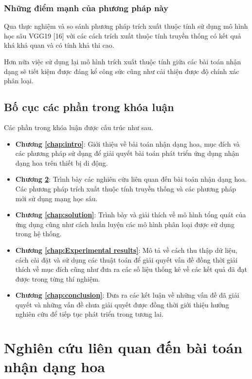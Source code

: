 \documentclass[12pt]{report}
\begin{document}
										
		\subsection{Những điểm mạnh của phương pháp này}
		Qua thực nghiệm và so sánh phương pháp trích xuất thuộc tính sử dụng mô hình học sâu VGG19 [16] với các cách trích xuất thuộc tính truyền thống có kết quả khá khả quan và có tính khả thi cao.
						
		Hơn nữa việc sử dụng lại mô hình trích xuất thuộc tính giữa các bài toán nhận dạng sẽ tiết kiệm được đáng kể công sức cũng như cải thiện được độ chính xác phân loại.
						
		\section{Bố cục các phần trong khóa luận}
		Các phần trong khóa luận được cấu trúc như sau.
						
				
		\begin{itemize}
			\item \textbf{Chương \ref{chap:intro}}: Giới thiệu về bài toán nhận dạng hoa, mục đích và các phương pháp sử dụng để giải quyết bài toán phát triển ứng dụng nhận dạng hoa trên thiết bị di động.
			\item \textbf{Chương \ref{chap:background}}: Trình bày các nghiên cứu liên quan đến bài toán nhận dạng hoa. Các phương pháp trích xuất thuộc tính truyền thống và các phương pháp mới sử dụng mạng học sâu.
			\item \textbf{Chương \ref{chap:solution}}: Trình bày và giải thích về mô hình tổng quát của ứng dụng cũng như cách huấn luyện các mô hình phân loại được sử dụng trong hệ thống.
			\item \textbf{Chương \ref{chap:Experimental results}}: Mô tả về cách thu thập dữ liệu, cách cài đặt và sử dụng các thuật toán để giải quyết vấn đề đồng thời giải thích về mục đích cũng như đưa ra các số liệu thống kê về các kết quả đã đạt được trong từng thí nghiệm. 
			\item \textbf{Chương \ref{chap:conclusion}}: Đưa ra các kết luận về những vấn đề đã giải quyết và những vấn đề chưa giải quyết được đồng thời giới thiệu hướng nghiên cứu để tiếp tục phát triển trong tương lai.	      
		\end{itemize}
						
		
				
				
		\newpage	
		\chapter{Nghiên cứu liên quan đến bài toán nhận dạng hoa}
		\label{chap:background}
								
\end{document}
